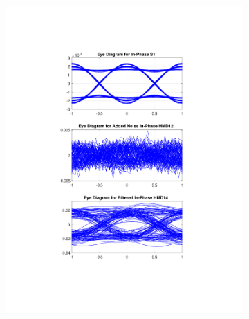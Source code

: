 \begin{figure}[H]
	\centering
	\begin{subfigure}{.45\textwidth}
		\centering
		\includegraphics[clip, trim=5cm 4cm 5cm 4cm, width=\textwidth]{./sdf/m_qam_system/figures/eyes/if_p_60_09.pdf}
	\end{subfigure}
	\begin{subfigure}{.45\textwidth}
		\centering

\end{subfigure}
\end{figure}
